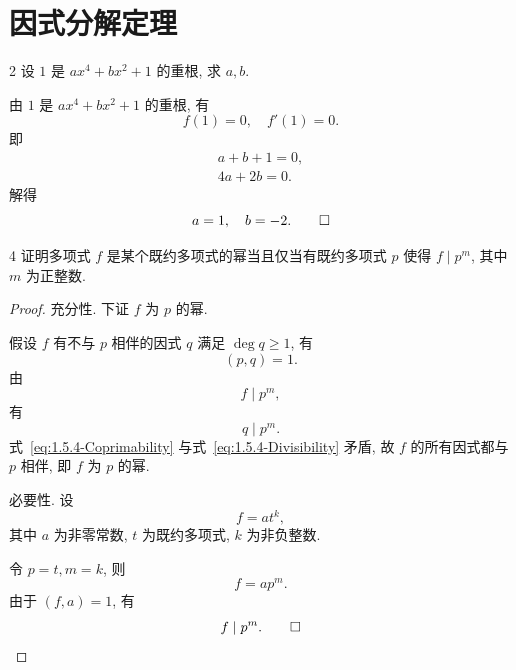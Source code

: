 
\renewcommand{\thesection}{1.5}

\section{因式分解定理}\label{sec:1.5}

\begin{ex}{2}\label{ex:1.5.2}
    设 \(1\) 是 \(ax^4+bx^2+1\) 的重根, 求 \(a,b\).
\end{ex}

\begin{solution}
    由 \(1\) 是 \(ax^4+bx^2+1\) 的重根, 有
    \[
    f(1)=0,\quad f'(1)=0.
    \]
    即
    \begin{gather*}
        a+b+1=0, \\
        4a+2b=0.
    \end{gather*}
    解得
    \[
    a=1,\quad b=-2.\qedhere
    \]
\end{solution}

\begin{ex}{4}\label{ex:1.5.4}
    证明多项式 \(f\) 是某个既约多项式的幂当且仅当有既约多项式 \(p\) 使得 \(f\mid p^m\),
    其中 \(m\) 为正整数.
\end{ex}

\begin{proof}
    充分性. 下证 \(f\) 为 \(p\) 的幂.

    假设 \(f\) 有不与 \(p\) 相伴的因式 \(q\) 满足 \(\deg q\geq1\), 有
    \begin{equation}
        (p,q)=1.
        \label{eq:1.5.4-Coprimability}
    \end{equation}
    由
    \[
    f\mid p^m,
    \]
    有
    \begin{equation}
        q\mid p^m.
        \label{eq:1.5.4-Divisibility}
    \end{equation}
    式~\eqref{eq:1.5.4-Coprimability} 与式~\eqref{eq:1.5.4-Divisibility} 矛盾,
    故 \(f\) 的所有因式都与 \(p\) 相伴, 即 \(f\) 为 \(p\) 的幂.

    必要性. 设
    \[
    f=at^k,
    \]
    其中 \(a\) 为非零常数, \(t\) 为既约多项式, \(k\) 为非负整数.

    令 \(p=t,m=k\), 则
    \[
    f=ap^m.
    \]
    由于 \((f,a)=1\), 有
    \[
    f\mid p^m.\qedhere
    \]
\end{proof}